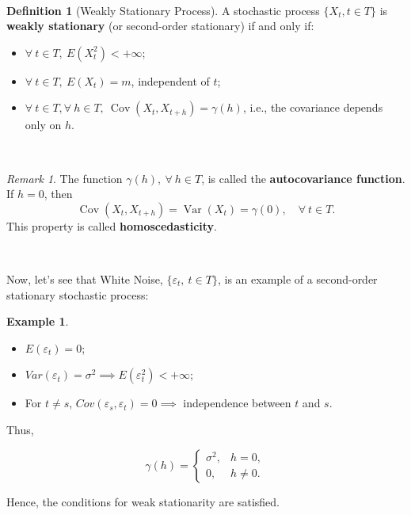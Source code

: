 \documentclass[
  11pt,
  a4paper,
]{book}
\theoremstyle{definition}
\newtheorem{definition}{Definition}[chapter]
\theoremstyle{definition}
\newtheorem{example}{Example}[chapter]
\theoremstyle{definition}
\theoremstyle{definition}
\theoremstyle{remark}
\newtheorem*{remark}{Remark}
\begin{document}
\(\,\)

\begin{definition}[Weakly Stationary Process]

A stochastic process \(\{X_t, t \in T\}\) is \textbf{weakly stationary} (or second-order stationary) if and only if:

\begin{itemize}
\item
  \(\forall ~t \in T, ~ E(X_t^2) < +\infty\);
\item
  \(\forall ~t \in T, ~ E(X_t) = m\), independent of \(t\);
\item
  \(\forall ~t \in T, \forall ~h \in T, ~ \operatorname{Cov}(X_t, X_{t+h}) = \gamma(h)\), i.e., the covariance depends only on \(h\).
\end{itemize}

\end{definition}

\(\,\)

\begin{remark}
The function \(\gamma(h), ~ \forall ~ h \in T\), is called the \textbf{autocovariance function}. If \(h=0\), then
\[
\operatorname{Cov}(X_t, X_{t+h}) = \operatorname{Var}(X_t) = \gamma(0), \quad \forall ~ t \in T.
\]
This property is called \textbf{homoscedasticity}.
\end{remark}

\(\,\)

Now, let's see that White Noise, \(\{\varepsilon_t, ~ t \in T\}\), is an example of a second-order stationary stochastic process:

\begin{example}
\leavevmode

\begin{itemize}
\item
  \(E(\varepsilon_t) = 0\);
\item
  \(Var(\varepsilon_t) = \sigma^2 \implies E(\varepsilon_t^2) < + \infty\);
\item
  For \(t \neq s\), \(Cov(\varepsilon_s, \varepsilon_t) = 0 \implies\) independence between \(t\) and \(s\).
\end{itemize}

Thus,

\[
\gamma(h) = 
\begin{cases}
\sigma^2, & h = 0, \\
0, & h \neq 0.
\end{cases}
\]

Hence, the conditions for weak stationarity are satisfied.

\end{example}
\end{document}
